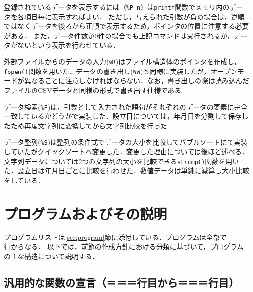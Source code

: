 \documentclass[a4j,11pt]{jarticle}
\begin{document}
登録されているデータを表示するには（\verb|%P n|）は\verb|printf|関数でメモリ内のデータを各項目毎に表示すればよい．
ただし，与えられた引数が負の場合は，逆順ではなくデータを後ろから正順で表示するため，ポインタの位置に注意する必要がある．
また，データ件数が0件の場合でも上記コマンドは実行されるが，データがないという表示を行わせている．

外部ファイルからのデータの入力(\verb|%R|)はファイル構造体のポインタを作成し，\verb|fopen()|関数を用いた．データの書き出し(\verb|%W|)も同様に実装したが，オープンモードが異なることに注意しなければならない．なお，書き出しの際は読み込んだファイルのCSVデータと同様の形式で書き出す仕様である.

データ検索(\verb|%F|)は，引数として入力された語句がそれぞれのデータの要素に完全一致しているかどうかで実装した．設立日については，年月日を分割して保存したため再度文字列に変換してから文字列比較を行った．

データ整列(\verb|%S|)は整列の条件式でデータの大小を比較してバブルソートにて実装していたがクイックソートへ変更した．変更した理由については後ほど述べる．文字列データについては2つの文字列の大小を比較できる\verb|strcmp()|関数を用いた．設立日は年月日ごとに比較を行わせた．数値データは単純に減算し大小比較をしている．


\section{プログラムおよびその説明}\label{sec:explain}



プログラムリストは\ref{sec:program}節に添付している．プログラムは全部で＝＝＝行からなる．
以下では，前節の作成方針における分類に基づいて，プログラムの主な構造について説明する．

\subsection{汎用的な関数の宣言（＝＝＝行目から＝＝＝行目）}
\end{document}
